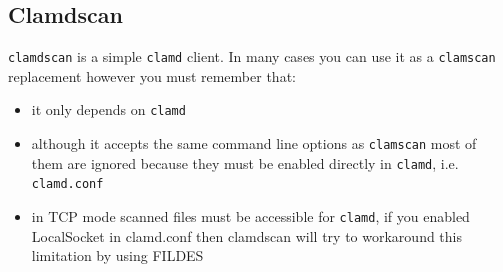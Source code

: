 \documentclass[a4paper,titlepage,12pt]{article}
\begin{document}
    \subsection{Clam\textbf{d}scan}
    \verb+clamdscan+ is a simple \verb+clamd+ client. In many cases you can
    use it as a \verb+clamscan+ replacement however you must remember that:
    \begin{itemize}
	\item it only depends on \verb+clamd+
	\item although it accepts the same command line options as
	      \verb+clamscan+ most of them are ignored because they must be
	      enabled directly in \verb+clamd+, i.e. \verb+clamd.conf+
	\item in TCP mode scanned files must be accessible for \verb+clamd+,
	      if you enabled LocalSocket in clamd.conf then clamdscan will
	      try to workaround this limitation by using FILDES
    \end{itemize}
\end{document}
